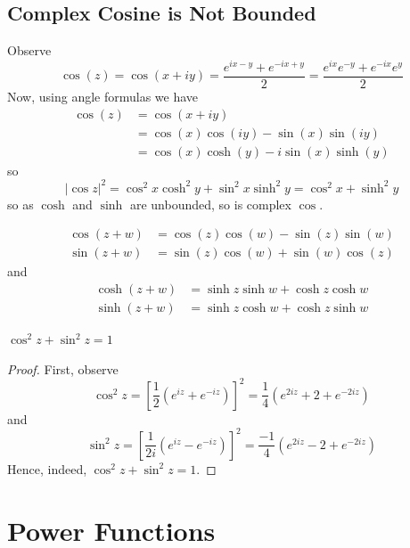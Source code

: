 \documentclass[12pt, a4paper, oneside, openright, titlepage]{book}
\begin{document}
\subsection{Complex Cosine is Not Bounded}

Observe \begin{equation*}
    \cos(z) = \cos(x+iy) = \frac{e^{ix-y}+e^{-ix+y}}{2} = \frac{e^{ix}e^{-y}+e^{-ix}e^y}{2}
\end{equation*}
Now, using angle formulas we have \begin{align*}
    \cos(z) &= \cos(x+iy) \\
    &= \cos(x)\cos(iy)-\sin(x)\sin(iy) \\
    &= \cos(x)\cosh(y)-i\sin(x)\sinh(y)
\end{align*}
so \begin{equation*}
    |\cos z|^2 = \cos^2x\cosh^2y+\sin^2x\sinh^2y = \cos^2x+\sinh^2y
\end{equation*}
so as $\cosh$ and $\sinh$ are unbounded, so is complex $\cos$. 

\begin{claim}
    \begin{align*}
        \cos(z+w) &= \cos(z)\cos(w)-\sin(z)\sin(w) \\
        \sin(z+w) &= \sin(z)\cos(w)+\sin(w)\cos(z) 
    \end{align*}
    and \begin{align*}
        \cosh(z+w) &= \sinh z\sinh w + \cosh z\cosh w \\
        \sinh(z+w) &= \sinh z\cosh w + \cosh z\sinh w
    \end{align*}
\end{claim}


\begin{claim}
    $\cos^2z+\sin^2z = 1$
\end{claim}
\begin{proof}
    First, observe \begin{equation*}
        \cos^2z = \left[\frac{1}{2}(e^{iz}+e^{-iz})\right]^2 = \frac{1}{4}(e^{2iz}+2+e^{-2iz})
    \end{equation*}
    and \begin{equation*}
        \sin^2z = \left[\frac{1}{2i}(e^{iz}-e^{-iz})\right]^2 = \frac{-1}{4}(e^{2iz}-2+e^{-2iz})
    \end{equation*}
    Hence, indeed, $\cos^2z + \sin^2z = 1$.
\end{proof}


\section{Power Functions}
\end{document}
